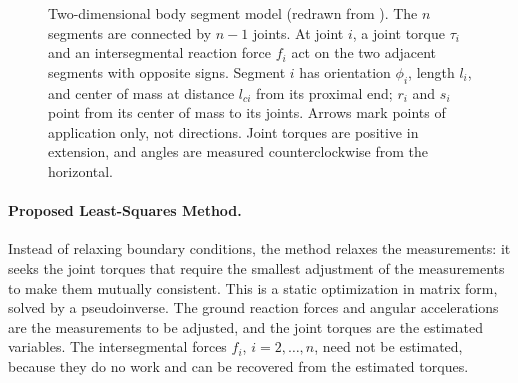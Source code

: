 \documentclass[11pt]{article}
\begin{document}
\begin{figure}[t]
\caption{Two-dimensional body segment model (redrawn from \cite{Kuo1998}).
The $n$ segments are connected by $n-1$ joints. At joint $i$, a joint torque
$\tau_i$ and an intersegmental reaction force $f_i$ act on the two adjacent
segments with opposite signs. Segment $i$ has orientation $\phi_i$, length
$l_i$, and center of mass at distance $l_{ci}$ from its proximal end;
$r_i$ and $s_i$ point from its center of mass to its joints. Arrows mark
points of application only, not directions. Joint torques are positive in
extension, and angles are measured counterclockwise from the horizontal.}
\label{fig:1}
\end{figure}

\paragraph{Proposed Least-Squares Method.} Instead of relaxing boundary
conditions, the method relaxes the measurements: it seeks the joint torques
that require the smallest adjustment of the measurements to make them
mutually consistent. This is a static optimization in matrix form, solved by
a pseudoinverse. The ground reaction forces and angular accelerations are the
measurements to be adjusted, and the joint torques are the estimated
variables. The intersegmental forces $f_i$, $i=2,\ldots,n$, need not be
estimated, because they do no work and can be recovered from the estimated
torques.
\end{document}
